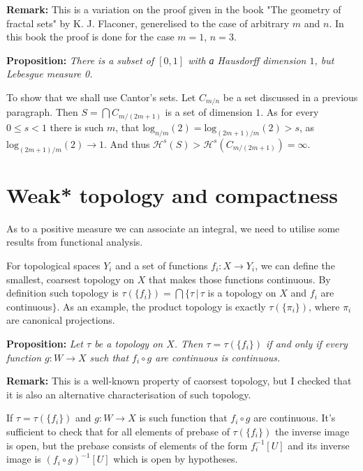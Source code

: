 \documentclass{article}
\begin{document}
\vspace{1ex}
\textbf{Remark:} This is a variation on the proof given in the book "The geometry
of fractal sets" by K. J. Flaconer, generelised to the case of arbitrary $m$ and
$n$. In this book the proof is done for the case $m=1$, $n=3$.

\vspace{1ex}
\textbf{Proposition:} \textit{There is a subset of $[0,1]$ with а Hausdorff dimension
$1$, but Lebesgue measure 0.}

\vspace{1ex}
To show that we shall use Cantor's sets. Let $C_{m/n}$ be a set discussed in a
previous paragraph. Then $S=\bigcap C_{m/(2m+1)}$ is a set of dimension $1$. As
for every $0\leq s<1$ there is such $m$, that $\text{log}_{n/m}(2)=\text{log}_{
(2m+1)/m}(2)>s$, as $\text{log}_{(2m+1)/m}(2)\rightarrow 1$. And thus $\mathcal
{H}^s(S)>\mathcal{H}^s(C_{m/(2m+1)})=\infty$.

\section{Weak* topology and compactness}
As to a positive measure we can associate an integral, we need to utilise some
results from functional analysis.
\vspace{1ex}

For topological spaces $Y_i$ and a set of functions $f_i:X\rightarrow Y_i$, we can
define the smallest, coarsest topology on $X$ that makes those functions continuous.
By definition such topology is $\tau(\{f_i\})=\bigcap\{\tau\,|\,
\tau$ is a topology on $X$ and $f_i$ are continuous$\}$. As an
example, the product topology is exactly $\tau(\{\pi_i\})$, where $\pi_i$ are
canonical projections.
\vspace{1ex}

\textbf{Proposition:} \textit{Let $\tau$ be a topology on $X$. Then $\tau=\tau(\{f_i\})$
if and only if every function $g:W\rightarrow X$ such that $f_i\circ g$ are
continuous is continuous.}
\vspace{1ex}

\textbf{Remark:} This is a well-known property of caorsest topology, but I
checked that it is also an alternative characterisation of such topology.

If $\tau=\tau(\{f_i\})$ and $g:W\rightarrow X$ is such function that $f_i\circ
g$ are continuous. It's sufficient to check that for all elements of prebase
of $\tau(\{f_i\})$ the inverse image is open, but the prebase consists of
elements of the form $f_i^{-1}[U]$ and its inverse image is $(f_i\circ g)^{-1}[U]$
which is open by hypotheses.
\vspace{1ex}
\end{document}

